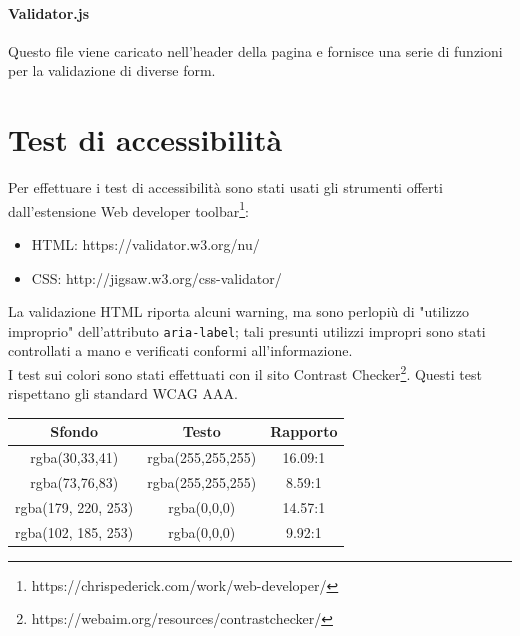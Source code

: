 \documentclass[12pt, a4paper]{article}
\begin{document}
    \paragraph{Validator.js} Questo file viene caricato nell'header della pagina e fornisce una serie di funzioni per la validazione di diverse form.


    \section{Test di accessibilità}
    Per effettuare i test di accessibilità sono stati usati gli strumenti offerti dall'estensione Web developer toolbar\footnote{https://chrispederick.com/work/web-developer/}:
    \begin{itemize}
        \item HTML: https://validator.w3.org/nu/
        \item CSS: http://jigsaw.w3.org/css-validator/
    \end{itemize}

    La validazione HTML riporta alcuni warning, ma sono perlopiù di "utilizzo improprio" dell'attributo \texttt{aria-label}; tali presunti utilizzi impropri sono stati controllati a mano e verificati conformi all'informazione.
    \\ 
    I test sui colori sono stati effettuati con il sito Contrast Checker\footnote{https://webaim.org/resources/contrastchecker/}. Questi test rispettano gli standard WCAG AAA.
    \begin{center}
    \begin{tabular}{c|c|c}
    Sfondo & Testo & Rapporto \\
    \hline
    rgba(30,33,41) & rgba(255,255,255) & 16.09:1 \\
    rgba(73,76,83) & rgba(255,255,255) & 8.59:1 \\
    rgba(179, 220, 253) & rgba(0,0,0) & 14.57:1 \\
    rgba(102, 185, 253) & rgba(0,0,0) & 9.92:1 
    \end{tabular}
\end{center}
\end{document}

